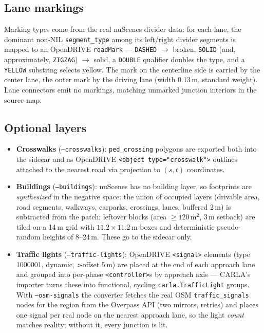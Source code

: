 \documentclass[11pt]{article}
\newcommand{\code}[1]{{\setlength{\fboxsep}{1.5pt}\colorbox{codegray}{\small\texttt{#1}}}}
\begin{document}
\subsection{Lane markings}
Marking types come from the real nuScenes divider data: for each lane, the dominant
non-NIL \code{segment\_type} among its left/right divider segments is mapped to an
OpenDRIVE \code{roadMark} --- \code{DASHED} $\rightarrow$ broken, \code{SOLID} (and,
approximately, \code{ZIGZAG}) $\rightarrow$ solid, a \code{DOUBLE} qualifier doubles the
type, and a \code{YELLOW} substring selects yellow. The mark on the centerline side is
carried by the center lane, the outer mark by the driving lane (width 0.13\,m,
standard weight). Lane connectors emit no markings, matching unmarked junction
interiors in the source map.

\subsection{Optional layers}
\begin{itemize}
\item \textbf{Crosswalks} (\code{--crosswalks}): \code{ped\_crossing} polygons are
      exported both into the sidecar and as OpenDRIVE
      \code{<object type="crosswalk">} outlines attached to the nearest road via
      projection to $(s,t)$ coordinates.
\item \textbf{Buildings} (\code{--buildings}): nuScenes has no building layer, so
      footprints are \emph{synthesized} in the negative space: the union of occupied
      layers (drivable area, road segments, walkways, carparks, crossings, lanes,
      buffered 2\,m) is subtracted from the patch; leftover blocks (area
      $\ge 120$\,m$^2$, 3\,m setback) are tiled on a 14\,m grid with
      $11.2\times11.2$\,m boxes and deterministic pseudo-random heights of 8--24\,m.
      These go to the sidecar only.
\item \textbf{Traffic lights} (\code{--traffic-lights}): OpenDRIVE \code{<signal>}
      elements (type 1000001, dynamic, $z$-offset 5\,m) are placed at the end of each
      approach lane and grouped into per-phase \code{<controller>}s by approach axis
      --- CARLA's importer turns these into functional, cycling
      \code{carla.TrafficLight} groups. With \code{--osm-signals} the converter fetches
      the real OSM \code{traffic\_signals} nodes for the region from the Overpass API
      (two mirrors, retries) and places one signal per real node on the nearest
      approach lane, so the light \emph{count} matches reality; without it, every
      junction is lit.
\end{itemize}
\end{document}
